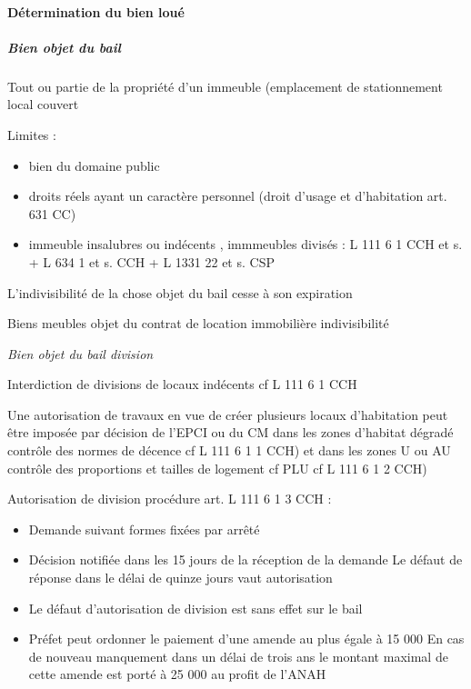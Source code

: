 \documentclass[10pt,a4paper,twoside]{article}
\newenvironment*{focus}[1][]{\medskip \textbf{#1} \newline \itshape}{}
\begin{document}
			\paragraph{Détermination du bien loué}

				\subparagraph{Bien objet du bail}

					Tout ou partie de la propriété d’un immeuble (emplacement de stationnement local couvert

					Limites :
					\begin{itemize}
						\item bien du domaine public

						\item droits réels ayant un caractère personnel (droit d’usage
						et d’habitation art. 631 CC)

						\item immeuble insalubres ou indécents , immmeubles divisés
						: L 111 6 1 CCH et s. + L 634 1 et s. CCH + L 1331 22
						et s. CSP
					\end{itemize}

					L’indivisibilité de la chose objet du bail cesse à son
					expiration

					Biens meubles objet du contrat de location
					immobilière indivisibilité

					\begin{focus}{Bien objet du bail division}

						Interdiction de divisions de locaux indécents cf L 111 6 1
						CCH

						Une autorisation de travaux en vue de créer plusieurs
						locaux d’habitation peut être imposée par décision de l’EPCI
						ou du CM dans les zones d’habitat dégradé contrôle des
						normes de décence cf L 111 6 1 1 CCH) et dans les zones
						U ou AU contrôle des proportions et tailles de logement cf
						PLU cf L 111 6 1 2 CCH)

						Autorisation de division procédure art. L 111 6 1 3 CCH :
						\begin{itemize}
							\item Demande suivant formes fixées par arrêté

							\item Décision notifiée dans les 15 jours de la réception de la
							demande Le défaut de réponse dans le délai de quinze jours
							vaut autorisation

							\item Le défaut d'autorisation de division est sans effet sur le bail

							\item Préfet peut ordonner le paiement d'une amende au plus
							égale à 15 000 En cas de nouveau manquement dans un
							délai de trois ans le montant maximal de cette amende est
							porté à 25 000 au profit de l’ANAH
						\end{itemize}
					\end{focus}
\end{document}
